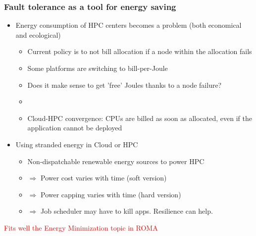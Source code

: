 \begin{frame}
  \frametitle{Fault tolerance as a tool for energy saving}

  \begin{itemize}
  \item Energy consumption of HPC centers becomes a problem (both economical and ecological)
    \begin{itemize}
    \item Current policy is to not bill allocation if a node within the allocation fails
    \item Some platforms are switching to bill-per-Joule
    \item Does it make sense to get 'free' Joules thanks to a node failure?
    \item[] ~
    \item Cloud-HPC convergence: CPUs are billed as soon as allocated, even if the application cannot be deployed
    \end{itemize}
  \item Using stranded energy in Cloud or HPC
    \begin{itemize}
    \item Non-dispatchable renewable energy sources to power HPC
    \item $\Rightarrow$ Power cost varies with time (soft version)
    \item $\Rightarrow$ Power capping varies with time (hard version)
    \item $\Rightarrow$ Job scheduler may have to kill apps. Resilience can help.
    \end{itemize}
  \end{itemize}
  \begin{center}
    \textcolor{red}{Fits well the Energy Minimization topic in ROMA}
  \end{center}
\end{frame}


